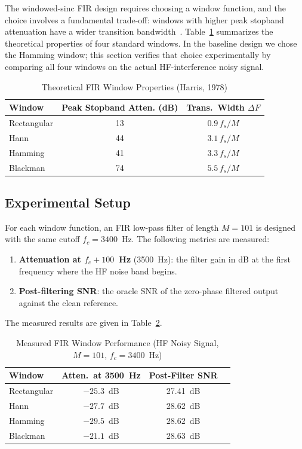 \documentclass[journal]{IEEEtran}
\begin{document}
The windowed-sinc FIR design requires choosing a window function, and the choice
involves a fundamental trade-off: windows with higher peak stopband attenuation
have a wider transition bandwidth~\cite{harris1978}. Table~\ref{tab:windows}
summarizes the theoretical properties of four standard windows. In the baseline
design we chose the Hamming window; this section verifies that choice
experimentally by comparing all four windows on the actual HF-interference noisy
signal.

\begin{table}[H]
  \centering
  \caption{Theoretical FIR Window Properties (Harris, 1978)}
  \label{tab:windows}
  \begin{tabular}{@{}lcc@{}}
    \toprule
    Window      & Peak Stopband Atten. (dB) & Trans.\ Width $\Delta F$ \\
    \midrule
    Rectangular & 13  & $0.9\,f_s / M$ \\
    Hann        & 44  & $3.1\,f_s / M$ \\
    Hamming     & 41  & $3.3\,f_s / M$ \\
    Blackman    & 74  & $5.5\,f_s / M$ \\
    \bottomrule
  \end{tabular}
\end{table}

\subsection{Experimental Setup}

For each window function, an FIR low-pass filter of length $M = 101$ is designed
with the same cutoff $f_c = 3400$~Hz. The following metrics are measured:
\begin{enumerate}
  \item \textbf{Attenuation at $f_c + 100$~Hz} (3500~Hz): the filter gain in dB
        at the first frequency where the HF noise band begins.
  \item \textbf{Post-filtering SNR}: the oracle SNR of the zero-phase filtered
        output against the clean reference.
\end{enumerate}
The measured results are given in Table~\ref{tab:window_results}.

\begin{table}[H]
  \centering
  \caption{Measured FIR Window Performance (HF Noisy Signal, $M=101$, $f_c=3400$~Hz)}
  \label{tab:window_results}
  \begin{tabular}{@{}lccc@{}}
    \toprule
    Window      & Atten.\ at 3500~Hz & Post-Filter SNR \\
    \midrule
    Rectangular & $-25.3$~dB         & 27.41~dB \\
    Hann        & $-27.7$~dB         & 28.62~dB \\
    Hamming     & $\mathbf{-29.5}$~dB & $\mathbf{28.62}$~dB \\
    Blackman    & $-21.1$~dB         & 28.63~dB \\
    \bottomrule
  \end{tabular}
\end{table}
\end{document}
